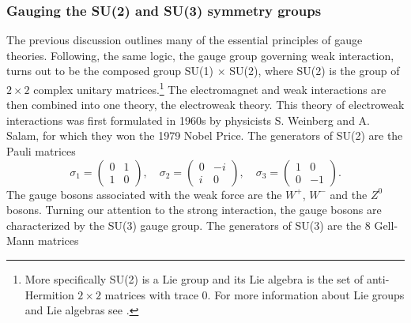 \subsubsection{Gauging the SU(2) and SU(3) symmetry groups} \label{sec:su2andsu3}
The previous discussion outlines many of the essential principles of gauge theories. Following, the same logic, the gauge group governing weak interaction, turns out to be the composed group SU(1) $\times$ SU(2), where SU(2) is the group of $2 \times 2$ complex unitary matrices.\footnote{More specifically SU(2) is a Lie group and its Lie algebra is the set of anti-Hermition $2 \times 2$ matrices with trace 0. For more information about Lie groups and Lie algebras see  \cite{fulton1991rtf}.} The electromagnet and weak interactions are then combined into one theory, the electroweak theory. This theory of electroweak interactions was first formulated in 1960s by physicists S. Weinberg and A. Salam, for which they won the 1979 Nobel Price. The generators of SU(2) are the Pauli matrices
\begin{equation}
	\sigma_1 =
	\begin{pmatrix}
	0&1\\
	1&0
	\end{pmatrix}, \quad
	\sigma_2 = 
	\begin{pmatrix}
	0&-i\\
	i&0
	\end{pmatrix}, \quad
	\sigma_3 = 
	\begin{pmatrix}
	1&0\\
	0&-1
	\end{pmatrix}.
\end{equation}
The gauge bosons associated with the weak force are the $W^+$, $W^-$ and the $Z^0$ bosons. Turning our attention to the strong interaction, the gauge bosons are characterized by the SU(3) gauge group. The generators of SU(3) are the 8 Gell-Mann matrices
